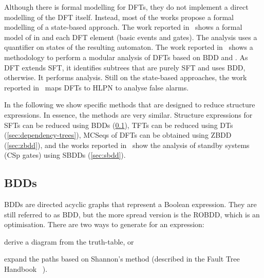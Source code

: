 \documentclass[12pt,openright,twoside,a4paper,oldfontcommands,english,brazil,final]{abntex2}
\theoremstyle{theo}
\def\FThandbook{Fault Tree Handbook~\cite{VGR+1981}\index{Fault Tree!Handbook}%
  \gdef\FThandbook{Fault Tree Handbook\index{Fault Tree!Handbook}\xspace}%
  \xspace}
\begin{document}
Although there is formal modelling for \acp{DFT}, they do not implement a direct modelling of the \ac{DFT} itself.
Instead, most of the works propose a formal modelling of a state-based approach.
The work reported in~\cite{CSD2000} shows a formal model of  in  and each \ac{DFT} element (basic events and gates).
The analysis uses a quantifier on states of the resulting  automaton.
The work reported in~\cite{GD1997} shows a methodology to perform a modular analysis of \acp{DFT} based on \ac{BDD} and .
As \ac{DFT} extends \ac{SFT}, it identifies subtrees that are purely \ac{SFT} and uses \ac{BDD}, otherwise.
It performs  analysis.
Still on the state-based approaches, the work reported in~\cite{SLD2011} maps \acp{DFT} to \ac{HLPN} to analyse false alarms.


In the following we show specific methods that are designed to reduce structure expressions.
In essence, the methods are very similar.
Structure expressions for \acp{SFT} can be reduced using \acp{BDD} (\cref{sec:bdd}), \acp{TFT} can be reduced using \acp{DT} (\cref{sec:dependency-trees}), \acp{MCSeq} of \acp{DFT} can be obtained using \ac{ZBDD} (\cref{sec:zbdd}), and the works reported in~\cite{TXD2011,XTD2012} show the analysis of standby systems (\ac{CSp} gates) using \acp{SBDD} (\cref{sec:sbdd}).

\subsection{\Aclp*{BDD}}
\label{sec:bdd}

\Acp{BDD} are directed acyclic graphs that represent a Boolean expression.
They are still referred to as \ac{BDD}, but the more spread version is the \ac{ROBDD}, which is an optimisation.
There are two ways to generate  for an expression:
\begin{alineasinline}
  \item derive a diagram from the truth-table, or
  \item expand the paths based on Shannon's method (described in the \FThandbook).
\end{alineasinline}
\end{document}
